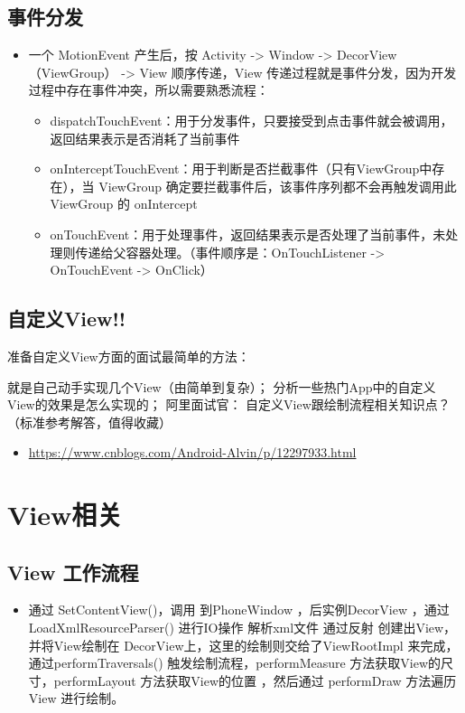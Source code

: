 \documentclass[9pt, b5paper]{article}
\begin{document}
\subsection{事件分发}
\label{sec-1-9}
\begin{itemize}
\item 一个 MotionEvent 产生后，按 Activity -> Window -> DecorView（ViewGroup） -> View 顺序传递，View 传递过程就是事件分发，因为开发过程中存在事件冲突，所以需要熟悉流程：
\begin{itemize}
\item dispatchTouchEvent：用于分发事件，只要接受到点击事件就会被调用，返回结果表示是否消耗了当前事件
\item onInterceptTouchEvent：用于判断是否拦截事件（只有ViewGroup中存在），当 ViewGroup 确定要拦截事件后，该事件序列都不会再触发调用此 ViewGroup 的 onIntercept
\item onTouchEvent：用于处理事件，返回结果表示是否处理了当前事件，未处理则传递给父容器处理。（事件顺序是：OnTouchListener -> OnTouchEvent -> OnClick）
\end{itemize}
\end{itemize}
\subsection{自定义View!!}
\label{sec-1-10}
准备自定义View方面的面试最简单的方法：

就是自己动手实现几个View（由简单到复杂）；
分析一些热门App中的自定义View的效果是怎么实现的；
阿里面试官： 自定义View跟绘制流程相关知识点？（标准参考解答，值得收藏）
\begin{itemize}
\item \url{https://www.cnblogs.com/Android-Alvin/p/12297933.html}
\end{itemize}


\section{View相关}
\label{sec-2}
\subsection{View 工作流程}
\label{sec-2-1}
\begin{itemize}
\item 通过 SetContentView()，调用 到PhoneWindow ，后实例DecorView ，通过 LoadXmlResourceParser() 进行IO操作 解析xml文件 通过反射 创建出View，并将View绘制在 DecorView上，这里的绘制则交给了ViewRootImpl 来完成，通过performTraversals() 触发绘制流程，performMeasure 方法获取View的尺寸，performLayout 方法获取View的位置 ，然后通过 performDraw 方法遍历View 进行绘制。
\end{itemize}
\end{document}
